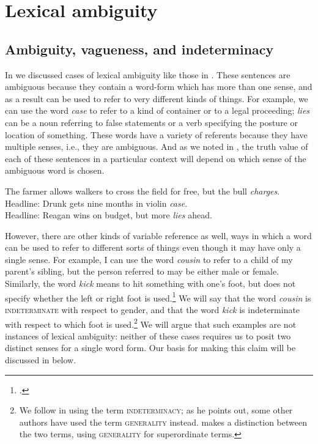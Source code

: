 \section{Lexical ambiguity}\label{sec:5.3}
\subsection{Ambiguity, vagueness, and indeterminacy}\label{sec:5.3.1}

In  we discussed cases of lexical ambiguity like those in . These sentences are ambiguous because they contain a word-form which has more than one sense, and as a result can be used to refer to very different kinds of things. For example, we can use the word \textit{case} to refer to a kind of container or to a legal proceeding; \textit{lies} can be a noun referring to false statements or a verb specifying the posture or location of something. These words have a variety of referents because they have multiple senses, i.e., they are ambiguous. And as we noted in , the truth value of each of these sentences in a particular context will depend on which sense of the ambiguous word is chosen.


\ea \label{ex:5.2}
\ea The farmer allows walkers to cross the field for free, but the bull \textit{charges}.\\
\ex Headline: Drunk gets nine months in violin \textit{case}.\\
\ex Headline: Reagan wins on budget, but more \textit{lies} ahead.
                       \z
\z


However, there are other kinds of variable reference as well, ways in which a word can be used to refer to different sorts of things even though it may have only a single sense. For example, I can use the word \textit{cousin} to refer to a child of my parent’s sibling, but the person referred to may be either male or female. Similarly, the word \textit{kick} means to hit something with one’s foot, but does not specify whether the left or right foot is used.\footnote{\citet{Lakoff1970}.} We will say that the word \textit{cousin} is \textsc{indeterminate} with respect to gender, and that the word \textit{kick} is indeterminate with respect to which foot is used.\footnote{We follow \citet{Kennedy2011} in using the term \textsc{indeterminacy}; as he points out, some other authors have used the term \textsc{generality} instead. \citet{Gillon1990} makes a distinction between the two terms, using \textsc{generality} for superordinate terms.} We will argue that such examples are not instances of lexical ambiguity: neither of these cases requires us to posit two distinct senses for a single word form. Our basis for making this claim will be discussed in  below.



